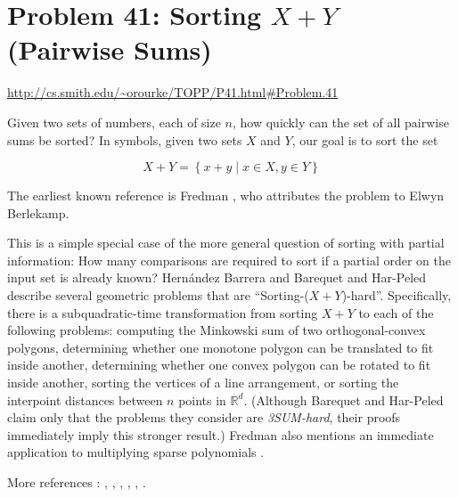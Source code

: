 

\section{Problem 41: Sorting $X + Y$ (Pairwise Sums)}

\url{http://cs.smith.edu/~orourke/TOPP/P41.html#Problem.41}


Given two sets of numbers, each of size $n$, how quickly can the set of all pairwise sums be sorted? In symbols, given two sets $X$ and $Y$, our goal is to sort the set

$$ X + Y = \left\{{x + y \mid x \in X, y \in Y }\right\} $$

The earliest known reference is Fredman \cite{fredman1976good}, who attributes the problem to Elwyn Berlekamp.

This is a simple special case of the more general question of sorting with partial information: How many comparisons are required to sort if a partial order on the input set is already known? Hernández Barrera \cite{barrera1996finding} and Barequet and Har-Peled \cite{barequet2001polygon} describe several geometric problems that are ``Sorting-($X + Y$)-hard''. Specifically, there is a subquadratic-time transformation from sorting $X + Y$ to each of the following problems: computing the Minkowski sum of two orthogonal-convex polygons, determining whether one monotone polygon can be translated to fit inside another, determining whether one convex polygon can be rotated to fit inside another, sorting the vertices of a line arrangement, or sorting the interpoint distances between $n$ points in $\mathbb{R}^d$. (Although Barequet and Har-Peled \cite{barequet2001polygon} claim only that the problems they consider are \emph{3SUM-hard}, their proofs immediately imply this stronger result.) Fredman also mentions an immediate application to multiplying sparse polynomials \cite{fredman1976good}.

More references : \cite{kahnkim1}, \cite{dietzfelbinger1989lower}, \cite{steiger1995pseudo}, \cite{lambert1990sorting}, \cite{erickson1997lower}, \cite{bremner2012necklaces}.



